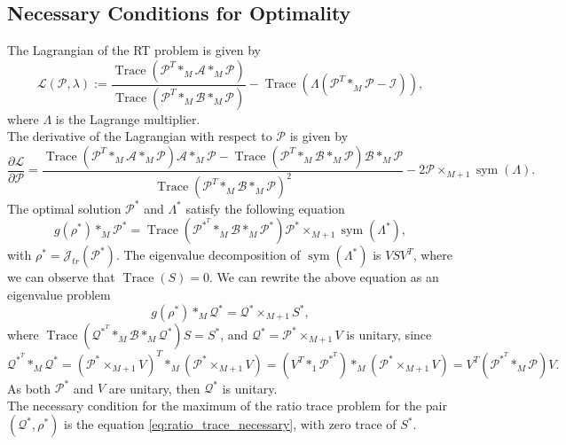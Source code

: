 \documentclass{siamltex}
\begin{document}
\subsection{Necessary Conditions for Optimality}
The Lagrangian of the RT problem is given by
\begin{equation}
\mathcal{L}(\mathcal{P},\lambda):=\frac{\operatorname{Trace}\left(\mathcal{P}^T *_M \mathcal{A} *_M \mathcal{P}\right)}{\operatorname{Trace}\left(\mathcal{P}^T *_M \mathcal{B} *_M \mathcal{P}\right)}
-\operatorname{Trace}\left( \Lambda \left(\mathcal{P}^T *_M \mathcal{P}-\mathcal{I}\right)\right),
\end{equation}
where $\Lambda$ is the Lagrange multiplier.\\
The derivative of the Lagrangian with respect to $\mathcal{P}$ is given by
\begin{equation*}
\frac{\partial \mathcal{L}}{\partial \mathcal{P}}=\frac{\operatorname{Trace}\left(\mathcal{P}^T *_M \mathcal{A} *_M \mathcal{P}\right) \mathcal{A} *_M \mathcal{P} - \operatorname{Trace}\left(\mathcal{P}^T *_M \mathcal{B} *_M \mathcal{P}\right) \mathcal{B} *_M \mathcal{P} }{\operatorname{Trace}\left(\mathcal{P}^T *_M \mathcal{B} *_M \mathcal{P}\right)^2} -2 \mathcal{P} \times_{M+1} \operatorname{sym}(\Lambda).
\end{equation*}
The optimal solution $\mathcal{P}^*$ and $\Lambda^*$ satisfy the following equation
\begin{equation*}
g(\rho^*) *_M \mathcal{P}^*= \operatorname{Trace}\left(\mathcal{P}^{*^T} *_M \mathcal{B} *_M \mathcal{P}^*\right) \mathcal{P}^* \times_{M+1} \operatorname{sym}(\Lambda^*),
\end{equation*}
with $\rho^*=\mathcal{J}_{tr}(\mathcal{P}^*)$. The eigenvalue decomposition of $\operatorname{sym}(\Lambda^*)$ is $VSV^T$, where we can observe that $\operatorname{Trace}(S)=0$. We can rewrite the above equation as an eigenvalue problem
\begin{equation}
\label{eq:ratio_trace_necessary}
g(\rho^*) *_M \mathcal{Q}^* = \mathcal{Q}^* \times_{M+1} S^*,
\end{equation}
where $\operatorname{Trace}(\mathcal{Q}^{*^T} *_M \mathcal{B} *_M \mathcal{Q}^*) S=S^*$, and $\mathcal{Q}^*=\mathcal{P}^* \times_{M+1} V$ is unitary, since 
$$\mathcal{Q}^{*^T} *_M \mathcal{Q}^*=(\mathcal{P}^* \times_{M+1} V)^T *_M( \mathcal{P}^* \times_{M+1} V)= (V^T *_1 \mathcal{P}^{*^T}) *_M( \mathcal{P}^* \times_{M+1} V)= V^T (\mathcal{P}^{*^T} *_M \mathcal{P}) V.$$
As both $\mathcal{P}^*$ and $V$ are unitary, then $\mathcal{Q}^*$ is unitary.\\
The necessary condition for the maximum of the ratio trace problem for the pair $(\mathcal{Q}^*,\rho^*)$ is the equation \ref{eq:ratio_trace_necessary}, with zero trace of $S^*$.
\end{document}

